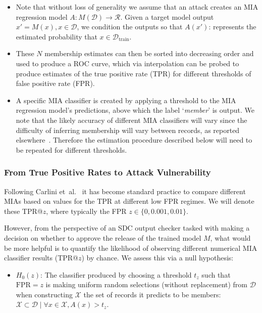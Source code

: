 \begin{itemize}
    \item Note that without loss of generality we assume that an attack creates an MIA regression model $A: M(\mathcal{D}) \rightarrow \mathcal{R}$. Given a  target model output $x' = M(x), x \in \mathcal{D}$, we condition the outputs so that $A(x')$: represents the estimated probability that $x \in \mathcal{D}_{\text{train}}$.

\item These $N$ membership estimates can then be sorted into decreasing order and used to produce a ROC curve, which via interpolation can be probed to produce estimates of the true positive rate (TPR) for different thresholds of false positive rate (FPR).

    \item A specific MIA classifier is created by applying a threshold to the MIA regression model's predictions, above which the label `\textit{member}' is output. We note that the likely accuracy of different MIA classifiers will vary since the difficulty of inferring membership will vary between records, as reported elsewhere~\cite{Carlini:2022, Zarifzadeh:2024}. Therefore the estimation procedure described below will need to be repeated for different thresholds.
\end{itemize}

\subsubsection{From True Positive Rates to Attack Vulnerability}

Following Carlini et~al.~\cite{Carlini:2022} it has become standard practice to compare different MIAs based on values for the TPR at different low FPR regimes. We will denote these TPR@$z$, where typically the FPR $z \in \{0, 0.001, 0.01\}$.

However, from the perspective of an SDC output checker tasked with making a decision on whether to approve the release of the trained model $M$, what would be more helpful is to quantify the likelihood of observing different numerical MIA classifier results (TPR@$z$) by chance.
We assess this via a null hypothesis:

\begin{itemize}
    \item $H_0(z)$: The classifier produced by choosing a threshold $t_z$ such that $\text{FPR}=z$ is making uniform random selections (without replacement) from $\mathcal{D}$ when constructing $\mathcal{X}$ the set of records it predicts to be members: $\mathcal{X}\subset \mathcal{D}\mid \forall  x \in \mathcal{X}, A(x)>t_z$.
\end{itemize} 

